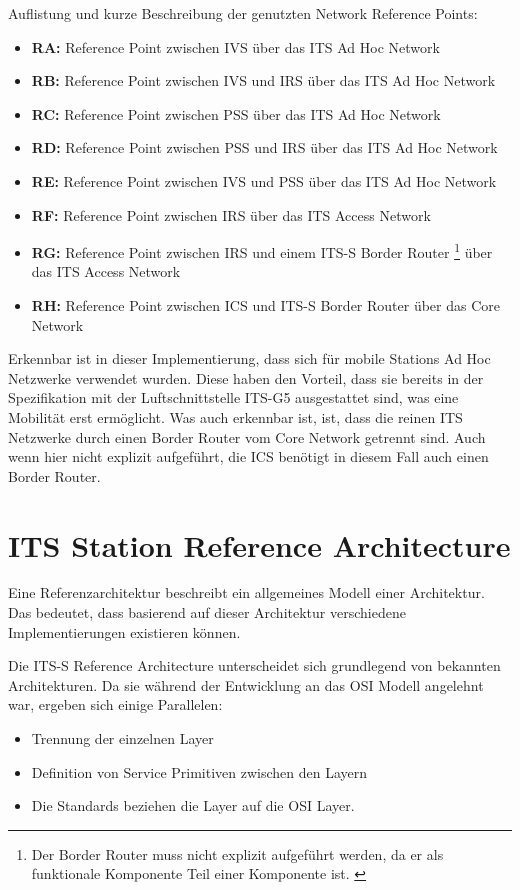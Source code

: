 Auflistung und kurze Beschreibung der genutzten Network Reference Points:
\begin{itemize}
	\item \textbf{RA: } Reference Point zwischen \ac{IVS} über das ITS Ad Hoc Network
	\item \textbf{RB: } Reference Point zwischen \ac{IVS} und \ac{IRS} über das ITS Ad Hoc Network
	\item \textbf{RC: } Reference Point zwischen \ac{PSS} über das ITS Ad Hoc Network
	\item \textbf{RD: } Reference Point zwischen \ac{PSS} und \ac{IRS} über das ITS Ad Hoc Network
	\item \textbf{RE: } Reference Point zwischen \ac{IVS} und \ac{PSS} über das ITS Ad Hoc Network
	\item \textbf{RF: } Reference Point zwischen \ac{IRS} über das ITS Access Network
	\item \textbf{RG: } Reference Point zwischen \ac{IRS} und einem ITS-S Border Router \footnote{Der Border Router muss nicht explizit aufgeführt werden, da er als funktionale Komponente Teil einer Komponente ist. \label{ftn:borderRouter}} über das ITS Access Network 
	\item \textbf{RH: } Reference Point zwischen \ac{ICS} und ITS-S Border Router  über das Core Network		
\end{itemize}

Erkennbar ist in dieser Implementierung, dass sich für mobile Stations Ad Hoc Netzwerke verwendet wurden. Diese haben den Vorteil, dass sie bereits in der Spezifikation mit der Luftschnittstelle ITS-G5 ausgestattet sind, was eine Mobilität erst ermöglicht. Was auch erkennbar ist, ist, dass die reinen ITS Netzwerke durch einen Border Router vom Core Network getrennt sind. Auch wenn hier nicht explizit aufgeführt, die \ac{ICS} benötigt in diesem Fall auch einen Border Router.

 
\section{ITS Station Reference Architecture}
Eine Referenzarchitektur beschreibt ein allgemeines Modell einer Architektur. Das bedeutet, dass basierend auf dieser Architektur verschiedene Implementierungen existieren können. 

Die \ac{ITS-S} Reference Architecture unterscheidet sich grundlegend von bekannten Architekturen. Da sie während der Entwicklung an das \ac{OSI} Modell angelehnt war, ergeben sich einige Parallelen:
\begin{itemize}
	\item Trennung der einzelnen Layer
	\item Definition von Service Primitiven zwischen den Layern
	\item Die Standards beziehen die Layer auf die \ac{OSI} Layer. 
\end{itemize}

